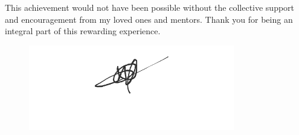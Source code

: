 \documentclass[12pt]{report}
\begin{document}
\vspace{10pt}
\noindent This achievement would not have been possible without the collective support and encouragement from my loved ones and mentors. Thank you for being an integral part of this rewarding experience.

\begin{figure}[h]
    \centering
    \includegraphics[width=0.8\textwidth]{signature.png}
\end{figure}
\end{document}
